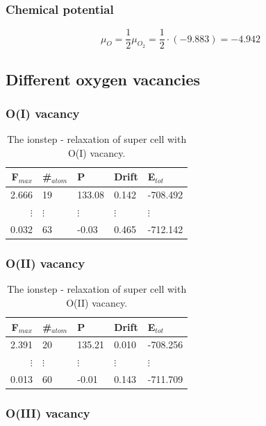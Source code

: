 \subsubsection{Chemical potential}


$$ \mu_O = \frac{1}{2}\mu_{O_2} = \frac{1}{2}\cdot(-9.883) = -4.942 $$

\subsection{Different oxygen vacancies}

\subsubsection{O(I) vacancy}


\begin{table}[H]\caption{The ionstep - relaxation of super cell with O(I) vacancy.}\label{tab:ionstep_O_I}
\begin{tabular}{rllll}
F$_{max}$ &\#$_{atom}$&	P&	Drift&	E$_{tot}$\\ \hline
2.666&	19&	133.08&	0.142&	-708.492\\
$\vdots$&$\vdots$&$\vdots$&$\vdots$&$\vdots$\\
0.032&	63&	-0.03&	0.465&	-712.142\\
\end{tabular}
\end{table}

\subsubsection{O(II) vacancy}

\begin{table}[H]\caption{The ionstep - relaxation of super cell with O(II) vacancy.}\label{tab:ionstep_O_II}
\begin{tabular}{rllll}
F$_{max}$ &\#$_{atom}$&	P&	Drift&	E$_{tot}$\\ \hline
2.391&	20&	135.21&	0.010&	-708.256	\\
$\vdots$&$\vdots$&$\vdots$&$\vdots$&$\vdots$\\
0.013&	60&	-0.01&	0.143&	-711.709\\
\end{tabular}
\end{table}


\subsubsection{O(III) vacancy}

